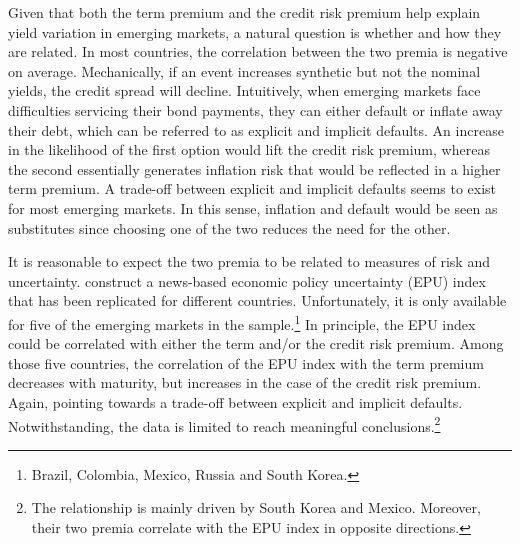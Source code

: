 {%
Given that both the term premium and the credit risk premium help explain yield variation in emerging markets, a natural question is whether and how they are related.
In most countries, the correlation between the two premia is negative on average.
Mechanically, if an event increases synthetic but not the nominal yields, the credit spread will decline.
Intuitively, when emerging markets face difficulties servicing their bond payments, they can either default or inflate away their debt, which can be referred to as explicit and implicit defaults. %
An increase in the likelihood of the first option would lift the credit risk premium, whereas the second essentially generates inflation risk that would be reflected in a higher term premium.
A trade-off between explicit and implicit defaults seems to exist for most emerging markets.
In this sense, inflation and default would be seen as substitutes since choosing one of the two reduces the need for the other.

It is reasonable to expect the two premia to be related to measures of risk and uncertainty.
\citet*{BakerBloomDavis:2016} construct a news-based economic policy uncertainty (EPU) index that has been replicated for different countries. 
Unfortunately, it is only available for five of the emerging markets in the sample.\footnote{ Brazil, Colombia, Mexico, Russia and South Korea.}
In principle, the EPU index could be correlated with either the term and/or the credit risk premium.
Among those five countries, the correlation of the EPU index with the term premium decreases with maturity, but increases in the case of the credit risk premium.
Again, pointing towards a trade-off between explicit and implicit defaults.
Notwithstanding, the data is limited to reach meaningful conclusions.\footnote{ The relationship is mainly driven by South Korea and Mexico. Moreover, their two premia correlate with the EPU index in opposite directions.}

}
